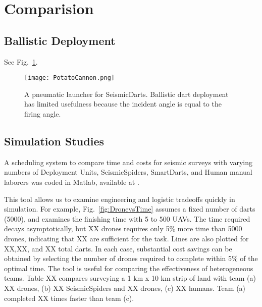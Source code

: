 \section{Comparision}\label{sec:Comparision}

\subsection{Ballistic Deployment}
See Fig.~\ref{fig:TradvsAutoDrop}.

\begin{figure} \centering
  {\texttt{[image: PotatoCannon.png]}}
 \caption{A pneumatic launcher for SeismicDarts.  Ballistic dart deployment has limited usefulness because the incident angle is equal to the firing angle.} 
 \label{fig:TradvsAutoDrop}
\end{figure}



\subsection{Simulation Studies}

A scheduling system to compare  time and costs for seismic surveys with varying numbers of Deployment Units, SeismicSpiders, SmartDarts, and Human manual laborers was coded in  {\sc Matlab}, available at \cite{Srikanth2016seismicScheduler}.

This tool allows us to examine engineering and logistic tradeoffs quickly in simulation.  For example, Fig.~\ref{fig:DronevsTime} assumes a fixed number of darts (5000), and examines the finishing time with 5 to 500 UAVs.  The time required decays asymptotically, but  XX drones requires only 5\% more time than 5000 drones, indicating that XX are sufficient for the task. Lines are also plotted for XX,XX, and XX total darts.  In each case, substantial cost savings can be obtained by selecting the number of drones required to complete within 5\% of the optimal time.
The tool is useful for comparing the effectiveness of heterogeneous teams.  Table XX compares surveying a 1 km x 10 km strip of land with team (a) XX drones, (b) XX SeismicSpiders and XX drones, (c) XX humans.  Team (a) completed XX times faster than team (c).

